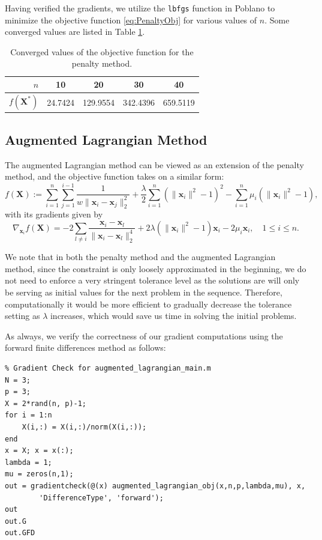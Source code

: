 \documentclass[11pt]{article}
\begin{document}
\noindent Having verified the gradients, we utilize the \texttt{lbfgs} function in Poblano to minimize the objective function \eqref{eq:PenaltyObj} for various values of $n$. Some converged values are listed in Table \ref{tb:ObjReg}.

\begin{table}[ht]
  \centering
  \begin{tabular}{rcccc}
	\toprule
	$n$ & 10 & 20 & 30 & 40 \\
	\midrule
	$f(\bm{X}^*)$ & 24.7424 & 129.9554 & 342.4396 & 659.5119 \\
	\bottomrule
  \end{tabular}
  \caption{Converged values of the objective function for the penalty method.}
  \label{tb:ObjReg}
\end{table}

\subsection{Augmented Lagrangian Method}

The augmented Lagrangian method can be viewed as an extension of the penalty method, and the objective function takes on a similar form:
\begin{equation}\label{eq:RegObj}
f(\bm{X}) := \sum_{i=1}^n\sum_{j=1}^{i-1}\frac{1}{w\|\bm{x}_i-\bm{x}_j\|_2^2} + \frac{\lambda}{2} \sum_{i=1}^n \left(\|\bm{x}_i\|^2-1\right)^2 - \sum_{i=1}^n \mu_i\left(\|\bm{x}_i\|^2-1\right),
\end{equation}
with its gradients given by
\begin{equation}\label{eq:gradient}
\nabla_{\bm{x}_i} f(\bm{X}) = -2\sum_{l\neq i} \frac{\bm{x}_i-\bm{x}_l}{\|\bm{x}_i-\bm{x}_l\|_2^4} + 2\lambda\left(\|\bm{x}_i\|^2-1\right)\bm{x}_i - 2\mu_i\bm{x}_i, \quad 1\le i\le n.
\end{equation}

We note that in both the penalty method and the augmented Lagrangian method, since the constraint is only loosely approximated in the beginning, we do not need to enforce a very stringent tolerance level as the solutions are will only be serving as initial values for the next problem in the sequence. Therefore, computationally it would be more efficient to gradually decrease the tolerance setting as $\lambda$ increases, which would save us time in solving the initial problems.

As always, we verify the correctness of our gradient computations using the forward finite differences method as follows:
\begin{lstlisting}
% Gradient Check for augmented_lagrangian_main.m
N = 3;
p = 3;
X = 2*rand(n, p)-1;
for i = 1:n
    X(i,:) = X(i,:)/norm(X(i,:));
end
x = X; x = x(:);
lambda = 1;
mu = zeros(n,1);
out = gradientcheck(@(x) augmented_lagrangian_obj(x,n,p,lambda,mu), x,
		'DifferenceType', 'forward');
out
out.G
out.GFD
\end{lstlisting}
\end{document}
